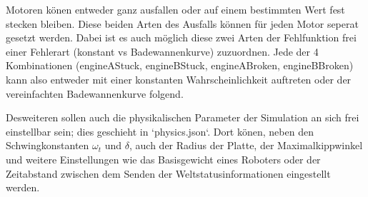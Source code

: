\documentclass[
    12pt,
    bibliography=totoc,
    ngerman,
    enabledeprecatedfontcommands
]{scrartcl}
\begin{document}
Motoren k{\"{o}}nen entweder ganz ausfallen oder auf einem bestimmten Wert fest stecken bleiben. Diese beiden Arten des Ausfalls k{\"{o}}nnen f{\"{u}}r jeden Motor seperat
gesetzt werden. Dabei ist es auch m{\"{o}}glich diese zwei Arten der Fehlfunktion frei einer Fehlerart (konstant vs Badewannenkurve) zuzuordnen. Jede der 4 Kombinationen
(engineAStuck, engineBStuck, engineABroken, engineBBroken) kann also entweder mit einer konstanten Wahrscheinlichkeit auftreten oder der vereinfachten Badewannenkurve folgend.

Desweiteren sollen auch die physikalischen Parameter der Simulation an sich frei einstellbar sein; dies geschieht in `physics.json`. Dort k{\"{o}}nen, neben den Schwingkonstanten
$\omega_t$ und $\delta$, auch der Radius der Platte, der Maximalkippwinkel und weitere Einstellungen wie das Basisgewicht eines Roboters oder der Zeitabstand zwischen dem
Senden der Weltstatusinformationen eingestellt werden.

\end{document}

